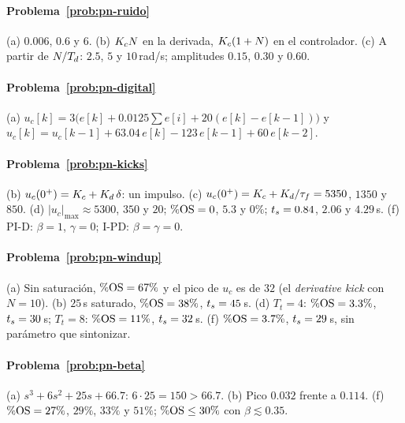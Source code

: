 \paragraph{Problema~\ref{prob:pn-ruido}}
(a) $0.006$, $0.6$ y $6$. (b) $K_c N$ en la derivada, $K_c(1+N)$ en el controlador. (c) A partir de $N/T_d$: $2.5$, $5$ y $10$\,rad/s; amplitudes $0.15$, $0.30$ y $0.60$.

\paragraph{Problema~\ref{prob:pn-digital}}
(a) $u_c[k]=3\bigl(e[k]+0.0125\sum e[i]+20(e[k]-e[k-1])\bigr)$ y $u_c[k]=u_c[k-1]+63.04\,e[k]-123\,e[k-1]+60\,e[k-2]$.

\paragraph{Problema~\ref{prob:pn-kicks}}
(b) $u_c(0^+)=K_c+K_d\,\delta$: un impulso. (c) $u_c(0^+)=K_c+K_d/\tau_f=5350$, $1350$ y $850$. (d) $|u_c|_{\max}\approx5300$, $350$ y $20$; $\%\mathrm{OS}=0$, $5.3$ y $0\%$; $t_s=0.84$, $2.06$ y $4.29$\,s. (f) PI-D: $\beta=1$, $\gamma=0$; I-PD: $\beta=\gamma=0$.

\paragraph{Problema~\ref{prob:pn-windup}}
(a) Sin saturación, $\%\mathrm{OS}=67\%$ y el pico de $u_c$ es de $32$ (el \emph{derivative kick} con $N=10$). (b) $25$\,s saturado, $\%\mathrm{OS}=38\%$, $t_s=45$\,s. (d) $T_t=4$: $\%\mathrm{OS}=3.3\%$, $t_s=30$\,s; $T_t=8$: $\%\mathrm{OS}=11\%$, $t_s=32$\,s. (f) $\%\mathrm{OS}=3.7\%$, $t_s=29$\,s, sin parámetro que sintonizar.

\paragraph{Problema~\ref{prob:pn-beta}}
(a) $s^3+6s^2+25s+66.7$: $6\cdot25=150>66.7$. (b) Pico $0.032$ frente a $0.114$. (f) $\%\mathrm{OS}=27\%$, $29\%$, $33\%$ y $51\%$; $\%\mathrm{OS}\le30\%$ con $\beta\lesssim0.35$.

\respuestaspausas
